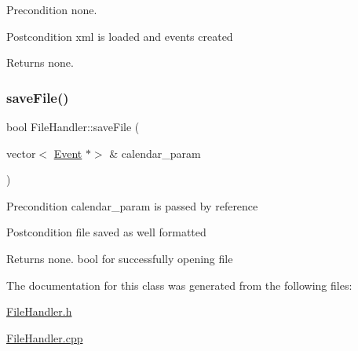 \begin{DoxyPrecond}{Precondition}
none. 
\end{DoxyPrecond}
\begin{DoxyPostcond}{Postcondition}
xml is loaded and events created 
\end{DoxyPostcond}
\begin{DoxyReturn}{Returns}
none. 
\end{DoxyReturn}
\mbox{\label{class_file_handler_a612156e5c57cf3086d9b03ae7446df9b}} 
\subsubsection{\texorpdfstring{save\+File()}{saveFile()}}
{\footnotesize\ttfamily bool File\+Handler\+::save\+File (\begin{DoxyParamCaption}\item[{vector$<$ \hyperlink{class_event}{Event} $\ast$$>$ \&}]{calendar\+\_\+param }\end{DoxyParamCaption})}

\begin{DoxyPrecond}{Precondition}
calendar\+\_\+param is passed by reference 
\end{DoxyPrecond}
\begin{DoxyPostcond}{Postcondition}
file saved as well formatted 
\end{DoxyPostcond}
\begin{DoxyReturn}{Returns}
none. bool for successfully opening file 
\end{DoxyReturn}


The documentation for this class was generated from the following files\+:\begin{DoxyCompactItemize}
\item 
\hyperlink{_file_handler_8h}{File\+Handler.\+h}\item 
\hyperlink{_file_handler_8cpp}{File\+Handler.\+cpp}\end{DoxyCompactItemize}
